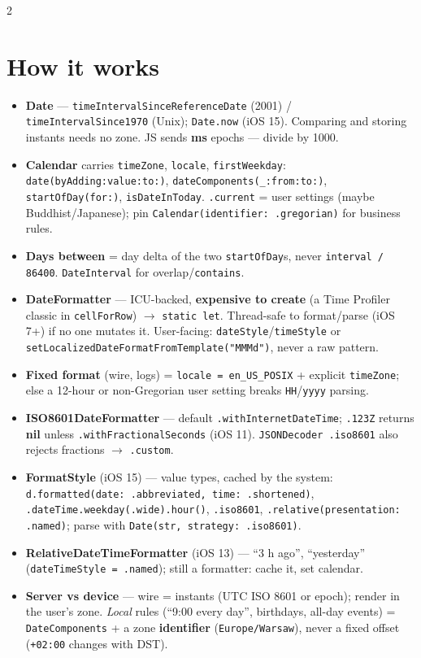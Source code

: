 \documentclass[8pt]{extarticle}
\begin{document}
\begin{multicols}{2}
\raggedright

\section{How it works}
\begin{itemize}
  \item \textbf{Date} — \texttt{timeIntervalSinceReferenceDate} (2001) /
        \texttt{timeIntervalSince1970} (Unix); \texttt{Date.now} (iOS 15). Comparing
        and storing instants needs no zone. JS sends \textbf{ms} epochs — divide by 1000.
  \item \textbf{Calendar} carries \texttt{timeZone}, \texttt{locale},
        \texttt{firstWeekday}: \texttt{date(byAdding:value:to:)},
        \texttt{dateComponents(\_:from:to:)}, \texttt{startOfDay(for:)},
        \texttt{isDateInToday}. \texttt{.current} = user settings (maybe Buddhist/Japanese); pin
        \texttt{Calendar(identifier: .gregorian)} for business rules.
  \item \textbf{Days between} = day delta of the two \texttt{startOfDay}s, never
        \texttt{interval / 86400}. \texttt{DateInterval} for overlap/\texttt{contains}.
  \item \textbf{DateFormatter} — ICU-backed, \textbf{expensive to create} (a Time
        Profiler classic in \texttt{cellForRow}) $\to$ \texttt{static let}. Thread-safe to
        format/parse (iOS 7+) if no one mutates it. User-facing:
        \texttt{dateStyle}/\texttt{timeStyle} or
        \texttt{setLocalizedDateFormatFromTemplate("MMMd")}, never a raw pattern.
  \item \textbf{Fixed format} (wire, logs) = \texttt{locale = en\_US\_POSIX} + explicit
        \texttt{timeZone}; else a 12-hour or non-Gregorian user setting breaks
        \texttt{HH}/\texttt{yyyy} parsing.
  \item \textbf{ISO8601DateFormatter} — default \texttt{.withInternetDateTime};
        \texttt{.123Z} returns \textbf{nil} unless \texttt{.withFractionalSeconds} (iOS 11).
        \texttt{JSONDecoder .iso8601} also rejects fractions $\to$ \texttt{.custom}.
  \item \textbf{FormatStyle} (iOS 15) — value types, cached by the system:
        \texttt{d.formatted(date: .abbreviated, time: .shortened)},
        \texttt{.dateTime.weekday(.wide).hour()}, \texttt{.iso8601},
        \texttt{.relative(presentation: .named)}; parse with
        \texttt{Date(str, strategy: .iso8601)}.
  \item \textbf{RelativeDateTimeFormatter} (iOS 13) — ``3 h ago'', ``yesterday''
        (\texttt{dateTimeStyle = .named}); still a formatter: cache it, set calendar.
  \item \textbf{Server vs device} — wire = instants (UTC ISO 8601 or epoch); render in the
        user's zone. \emph{Local} rules (``9:00 every day'', birthdays, all-day events) =
        \texttt{DateComponents} + a zone \textbf{identifier} (\texttt{Europe/Warsaw}),
        never a fixed offset (\texttt{+02:00} changes with DST).
\end{itemize}


\end{multicols}
\end{document}
